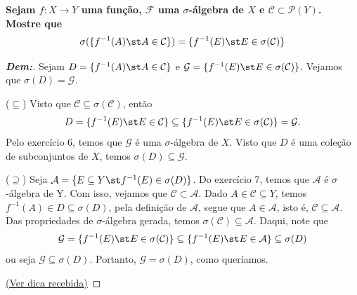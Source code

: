 \biglinend
\newpage
{}
\bigline 
\textbf{Sejam $f: X \rightarrow Y$ uma função, $\mathcal F$ uma $\sigma$-álgebra de $X$ e 
$\mathcal C \subset \mathcal P(Y)$. Mostre que 
\begin{align*}
  \sigma(\{f^{-1}(A)\st  A \in \mathcal C\}) = \{f^{-1}(E)\st  E \in \sigma(\mathcal C)\}
\end{align*}
}
\begin{proof}[\textbf{Dem:}] 
  Sejam $D = \{f^{-1}(A) \st  A \in \mathcal C\}$ e $\mathcal G = \{f^{-1}(E)\st  E \in \sigma(\mathcal C)\}$.
  Vejamos que $\sigma(D) = \mathcal G$.
  \vspace{3mm}

  ($\subseteq$) Visto que $\mathcal C \subseteq \sigma(\mathcal C)$, então 
  $$D = \{f^{-1}(E)\st  E \in \mathcal C\} \subseteq \{f^{-1}(E)\st  E \in \sigma(\mathcal C)\} = \mathcal G.$$
  Pelo exercício 6, temos que $\mathcal G$ é uma $\sigma$-álgebra de $X$. Visto que $D$ é uma 
  coleção de subconjuntos de $X$, temos $\sigma(D) \subseteq \mathcal G$. 

  ($\supseteq$) Seja $\mathcal A = \{E \subseteq Y\st  f^{-1}(E) \in \sigma(D)\}$. Do exercício 7, temos que 
  $\mathcal A$ é $\sigma$-álgebra de Y. Com isso, vejamos que $\mathcal C \subset \mathcal A$. 
  Dado $A \in \mathcal C \subseteq Y$, temos $f^{-1}(A) \in D \subseteq \sigma(D)$, pela definição de $\mathcal A$, 
  segue que $A \in \mathcal A$, isto é, $\mathcal C \subseteq \mathcal A$. Das propriedades de $\sigma$-álgebra gerada, 
  temos $\sigma(\mathcal C) \subseteq \mathcal A$. Daqui, note que 
  \begin{align*}
    \mathcal G = \{f^{-1}(E)\st  E \in \sigma(\mathcal C)\} \subseteq 
    \{f^{-1}(E)\st  E \in \mathcal A\} \subseteq \sigma(D)
  \end{align*}
  ou seja $\mathcal G \subseteq \sigma(D)$. Portanto, $\mathcal G = \sigma(D)$, como queríamos.

  \href{https://math.stackexchange.com/questions/1620852/how-to-proof-that-
  f-1-sigma-mathcal-c-subseteq-sigmaf-1-mathcal-c?noredirect=1&lq=1}{(Ver dica recebida)}
\end{proof}

